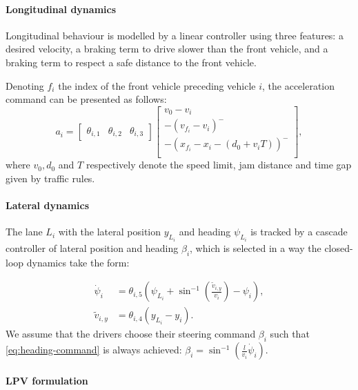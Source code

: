 \documentclass{article}
\begin{document}
\paragraph{Longitudinal dynamics}
Longitudinal behaviour is modelled by a linear controller using three features: a desired velocity, a braking term to drive slower than the front vehicle, and a braking term to respect a safe distance to the front vehicle.

Denoting $f_i$ the index of the front vehicle preceding vehicle $i$, the acceleration command can be presented as follows:
\begin{equation*}
a_i = \begin{bmatrix}
\theta_{i,1} & \theta_{i,2} & \theta_{i,3}
\end{bmatrix} \begin{bmatrix}
v_0 - v_i \\
-(v_{f_i}-v_i)^- \\
-(x_{f_i} - x_i - (d_0 + v_iT))^- \\
\end{bmatrix},
\label{eq:theta_a}
\end{equation*}
where $v_0, d_0$ and $T$ respectively denote the speed limit, jam distance and time gap given by traffic rules.

\paragraph{Lateral dynamics}

The lane $L_i$ with the lateral position $y_{L_i}$ and heading $\psi_{L_i}$ is tracked by a cascade controller of lateral position and heading $\beta_i$, which is selected in a way the closed-loop dynamics take the form:

\begin{align}
\label{eq:heading-command}
\dot{\psi}_i &= \theta_{i,5}\left(\psi_{L_i}+\sin^{-1}\left(\frac{\tilde{v}_{i,y}}{v_i}\right)-\psi_i\right),\\
\tilde{v}_{i,y} &= \theta_{i,4} (y_{L_i}-y_i). \nonumber
\end{align}
We assume that the drivers choose their steering command $\beta_i$ such that \eqref{eq:heading-command} is always achieved: $\beta_i = \sin^{-1}(\frac{l}{v_i}\dot{\psi}_i)$.

\paragraph{LPV formulation}
\end{document}
